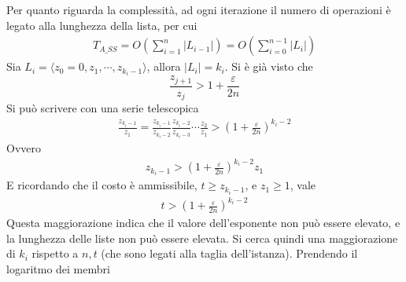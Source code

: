 Per quanto riguarda la complessità, ad ogni iterazione il numero di operazioni è legato alla lunghezza della lista, per cui
\begin{align*}
    T_{A\_SS} = 
    O \left( 
        \sum_{i=1}^{n} | L_{i-1} |
    \right)
    = 
    O \left( 
        \sum_{i=0}^{n-1} | L_{i} |
    \right)
\end{align*}
Sia $
L_i = \langle z_0 = 0, z_1, \cdots,
z_{k_i - 1}
\rangle 
$, allora $
| L_i | = k_i
$.
Si è già visto che 
\begin{equation*}
    \frac{
        z_{j+1}
    }{
        z_j
    }
    >
        1+
        \frac{\varepsilon}{2n}
\end{equation*}
Si può scrivere con una serie telescopica
\begin{align*}
    \frac{
        z_{k_i - 1}
    }{
        z_1
    }
    =
    \frac{
        z_{k_i - 1}
    }{
        z_{k_i - 2}
    }
    \frac{
        z_{k_i - 2}
    }{
        z_{k_i - 3}
    }
    \cdots
    \frac{
        z_2
    }{
        z_1
    }
    >
    \left(
        1+
        \frac{\varepsilon}{2n}
    \right)^{k_i -2}
\end{align*}
Ovvero
\begin{align*}
    z_{k_i - 1}
    >
    \left(
        1+
        \frac{\varepsilon}{2n}
    \right)^{k_i -2}
    z_1
\end{align*}
E ricordando che il costo è ammissibile, $t \geq
z_{k_i - 1}
$, e $z_1 \geq 1$, vale
\begin{align*}
    t >
    \left(
        1+
        \frac{\varepsilon}{2n}
    \right)^{k_i -2}
\end{align*}
Questa maggiorazione indica che il valore dell'esponente non può essere elevato, e la lunghezza delle liste non può essere elevata. Si cerca quindi una maggiorazione di $k_i$ rispetto a $n,t$ (che sono legati alla taglia dell'istanza). Prendendo il logaritmo dei membri
